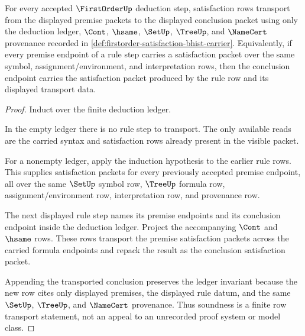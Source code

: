 \begin{theorem}\label{thm:firstorder-soundness-transport-row}
For every accepted $\FirstOrderUp$ deduction step, satisfaction rows transport
from the displayed premise packets to the displayed conclusion packet using
only the deduction ledger, $\Cont$, $\hsame$, $\SetUp$, $\TreeUp$, and
$\NameCert$ provenance recorded in \autoref{def:firstorder-satisfaction-bhist-carrier}.
Equivalently, if every premise endpoint of a rule step carries a satisfaction
packet over the same symbol, assignment/environment, and interpretation rows,
then the conclusion endpoint carries the satisfaction packet produced by the
rule row and its displayed transport data.
\end{theorem}
\begin{proof}
Induct over the finite deduction ledger.

In the empty ledger there is no rule step to transport. The only available
reads are the carried syntax and satisfaction rows already present in the
visible packet.

For a nonempty ledger, apply the induction hypothesis to the earlier rule
rows. This supplies satisfaction packets for every previously accepted premise
endpoint, all over the same $\SetUp$ symbol row, $\TreeUp$ formula row,
assignment/environment row, interpretation row, and provenance row.

The next displayed rule step names its premise endpoints and its conclusion
endpoint inside the deduction ledger. Project the accompanying $\Cont$ and
$\hsame$ rows. These rows transport the premise satisfaction packets across
the carried formula endpoints and repack the result as the conclusion
satisfaction packet.

Appending the transported conclusion preserves the ledger invariant because
the new row cites only displayed premises, the displayed rule datum, and the
same $\SetUp$, $\TreeUp$, and $\NameCert$ provenance. Thus soundness is a
finite row transport statement, not an appeal to an unrecorded proof system or
model class.
\end{proof}

